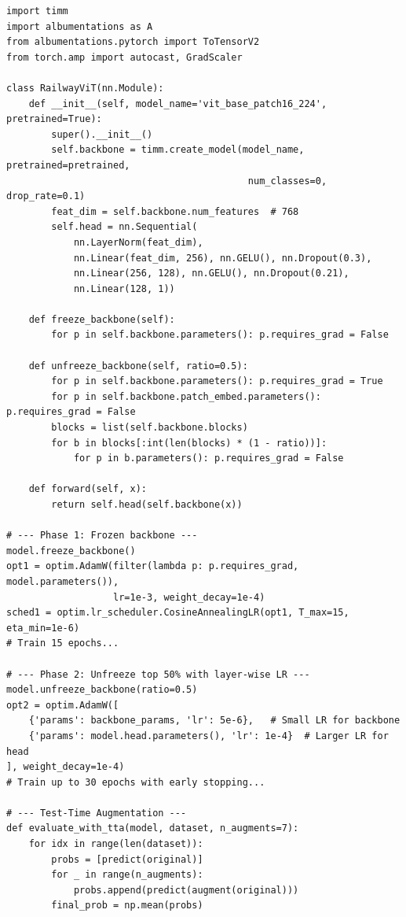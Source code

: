 \documentclass[10pt,twocolumn,letterpaper]{article}
\begin{document}
\begin{lstlisting}[caption={Pretrained ViT-B/16 with two-phase fine-tuning (key components).}]
import timm
import albumentations as A
from albumentations.pytorch import ToTensorV2
from torch.amp import autocast, GradScaler

class RailwayViT(nn.Module):
    def __init__(self, model_name='vit_base_patch16_224', pretrained=True):
        super().__init__()
        self.backbone = timm.create_model(model_name, pretrained=pretrained,
                                           num_classes=0, drop_rate=0.1)
        feat_dim = self.backbone.num_features  # 768
        self.head = nn.Sequential(
            nn.LayerNorm(feat_dim),
            nn.Linear(feat_dim, 256), nn.GELU(), nn.Dropout(0.3),
            nn.Linear(256, 128), nn.GELU(), nn.Dropout(0.21),
            nn.Linear(128, 1))

    def freeze_backbone(self):
        for p in self.backbone.parameters(): p.requires_grad = False

    def unfreeze_backbone(self, ratio=0.5):
        for p in self.backbone.parameters(): p.requires_grad = True
        for p in self.backbone.patch_embed.parameters(): p.requires_grad = False
        blocks = list(self.backbone.blocks)
        for b in blocks[:int(len(blocks) * (1 - ratio))]:
            for p in b.parameters(): p.requires_grad = False

    def forward(self, x):
        return self.head(self.backbone(x))

# --- Phase 1: Frozen backbone ---
model.freeze_backbone()
opt1 = optim.AdamW(filter(lambda p: p.requires_grad, model.parameters()),
                   lr=1e-3, weight_decay=1e-4)
sched1 = optim.lr_scheduler.CosineAnnealingLR(opt1, T_max=15, eta_min=1e-6)
# Train 15 epochs...

# --- Phase 2: Unfreeze top 50% with layer-wise LR ---
model.unfreeze_backbone(ratio=0.5)
opt2 = optim.AdamW([
    {'params': backbone_params, 'lr': 5e-6},   # Small LR for backbone
    {'params': model.head.parameters(), 'lr': 1e-4}  # Larger LR for head
], weight_decay=1e-4)
# Train up to 30 epochs with early stopping...

# --- Test-Time Augmentation ---
def evaluate_with_tta(model, dataset, n_augments=7):
    for idx in range(len(dataset)):
        probs = [predict(original)]
        for _ in range(n_augments):
            probs.append(predict(augment(original)))
        final_prob = np.mean(probs)
\end{lstlisting}
\end{document}
